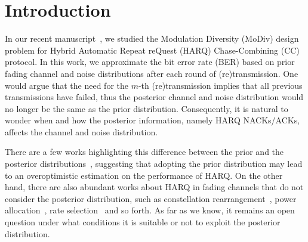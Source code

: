\documentclass[journal,draftcls,onecolumn,12pt,twoside]{IEEEtran}
\begin{document}
%
\IEEEpeerreviewmaketitle



\section{Introduction}
\label{sec:intro}
In our recent manuscript~\cite{wu2015modulation}, we studied the Modulation
Diversity (MoDiv) design problem for Hybrid Automatic Repeat reQuest (HARQ)
Chase-Combining (CC) protocol. In this work, we approximate the bit
error rate (BER) based on prior fading channel and noise distributions after
each round of (re)transmission. One would argue that the need for the
$m$-th (re)transmission implies that all previous transmissions have failed,
thus the posterior channel and noise distribution would no longer be the same as
the prior distribution. Consequently, it is natural to wonder when and how the
posterior information, namely HARQ NACKs/ACKs, affects the channel and noise
distribution.

There are a few works highlighting this difference between the prior and
the posterior
distributions~\cite{gu2006modeling}\cite{long2012analysis}\cite{alkurd2015modeling},
suggesting that adopting the prior distribution may lead to an overoptimistic
estimation on the performance of HARQ.
On the other hand, there are also abundant works about HARQ in fading channels
that do not consider the posterior distribution, such as constellation
rearrangement~\cite{harvind2005symbol}, power
allocation~\cite{chaitanya2014adaptive}, rate selection~\cite{jin2011optimal}
and so forth. As far as we know, it remains an open question
under what conditions it is suitable or not to exploit the posterior distribution.
\end{document}

